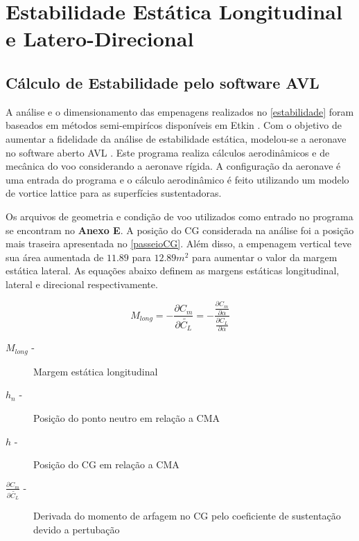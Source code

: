 \chapter{Estabilidade Estática Longitudinal e Latero-Direcional}

\section{Cálculo de Estabilidade pelo software AVL}

A análise e o dimensionamento das empenagens realizados no \autoref{estabilidade} foram baseados em métodos semi-empirícos disponíveis em Etkin \cite{etkin1996dynamics}. Com o objetivo de aumentar a fidelidade da análise de estabilidade estática, modelou-se a aeronave no software aberto AVL \cite{avl}. Este programa realiza cálculos aerodinâmicos e de mecânica do voo considerando a aeronave rígida. A configuração da aeronave é uma entrada do programa e o cálculo aerodinâmico é feito utilizando um modelo de vortice lattice para as superfícies sustentadoras.

Os arquivos de geometria e condição de voo utilizados como entrado no programa se encontram no \textbf{Anexo E}. A posição do CG considerada na análise foi a posição mais traseira apresentada no \autoref{passeioCG}. Além disso, a empenagem vertical teve sua área aumentada de $11.89$ para $12.89 m^2$ para aumentar o valor da margem estática lateral. As equações abaixo definem as margens estáticas longitudinal, lateral e direcional respectivamente.

\begin{equation}
  M_{long} = - \frac{\partial C_m}{ \partial \widetilde{C_L}} = - \frac{\frac{\partial C_m}{ \partial \alpha} }{\frac{\partial C_L}{ \partial \alpha} }
\end{equation}

\begin{description}
\item[$M_{long}$  -] Margem estática longitudinal
\item[$h_n$ -] Posição do ponto neutro em relação a CMA
\item[$h$ -] Posição do CG em relação a CMA
\item[$\frac{\partial C_m}{\partial \widetilde{C_L}}$ -] Derivada do momento de arfagem no CG pelo coeficiente de sustentação devido a pertubação
\end{description}

\vspace{1cm}

